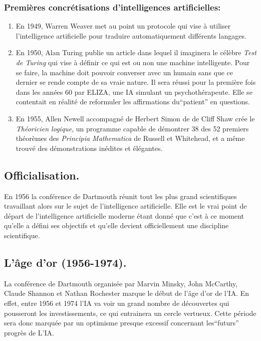 \documentclass[a4paper, 12pt]{article}
\numberwithin{equation}{subsection}
\begin{document}
\subsubsection{Premières concrétisations d'intelligences artificielles:}
\begin{enumerate}
  \item En 1949, Warren Weaver met au point un protocole qui vise à utiliser l'intelligence artificielle pour traduire automatiquement différents langages.
  \item En 1950, Alan Turing publie un article dans lequel il imaginera le célèbre \textit{Test de Turing} qui vise à définir ce qui est ou non une machine intelligente. Pour se faire, la machine doit pouvoir converser avec un humain sans que ce dernier se rende compte de sa vraie nature. Il sera réussi pour la première fois dans les années 60 par ELIZA, une IA simulant un psychothérapeute. Elle se contentait en réalité de reformuler les affirmations du``patient'' en questions.
  \item En 1955, Allen Newell accompagné de Herbert Simon de de Cliff Shaw crée le \textit{Théoricien logique}, un programme capable de démontrer 38 des 52 premiers théorèmes des \textit{Principia Mathematica} de Russell et Whitehead, et a même trouvé des démonstrations inédites et élégantes.
\end{enumerate}
\subsection{Officialisation.}
En 1956 la conférence de Dartmouth réunit tout les plus grand scientifiques travaillant alors sur le sujet de l'intelligence artificielle. Elle est le vrai point de départ de l'intelligence artificielle moderne étant donné que c'est à ce moment qu'elle a défini ses objectifs et qu'elle devient officiellement une discipline scientifique.
\subsection{L'âge d'or (1956-1974).}
La conférence de Dartmouth organisée par Marvin Minsky, John McCarthy, Claude Shannon et Nathan Rochester marque le début de l'âge d'or de l'IA. En effet, entre 1956 et 1974 l'IA va voir un grand nombre de découvertes qui pousseront les investissements, ce qui entrainera un cercle vertueux. Cette période sera donc marquée par un optimisme presque excessif concernant les``futurs'' progrès de L'IA.\\
\end{document}
